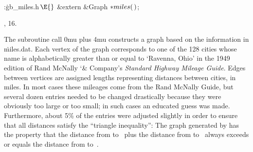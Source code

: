\Y\B\4:\.{gb\_miles.h\,}\X${}\E{}$\6
\&{extern} \&{Graph} ${}{*}\\{miles}(\,){}$;\par
{}, 16.\fi

The subroutine call {\advance\thinmuskip 0mu plus 4mu
}
constructs a graph based on the information in \.{miles.dat}.
Each vertex of the graph corresponds to one of the 128 cities whose
name is alphabetically greater than or equal to `Ravenna, Ohio' in
the 1949 edition of Rand McNally {\char`\&} Company's {\sl Standard Highway
Mileage Guide}. Edges between vertices are assigned lengths representing
distances between cities, in miles. In most cases these mileages come
from the Rand McNally Guide, but several dozen entries needed to be changed
drastically because they were obviously too large or too small; in such cases
an educated guess was made. Furthermore, about 5\% of the entries were
adjusted slightly in order to
ensure that all distances satisfy the ``triangle inequality'': The
graph generated by  has the property that the
distance from  to~ plus the distance from  to~
always exceeds
or equals the distance from  to~.

